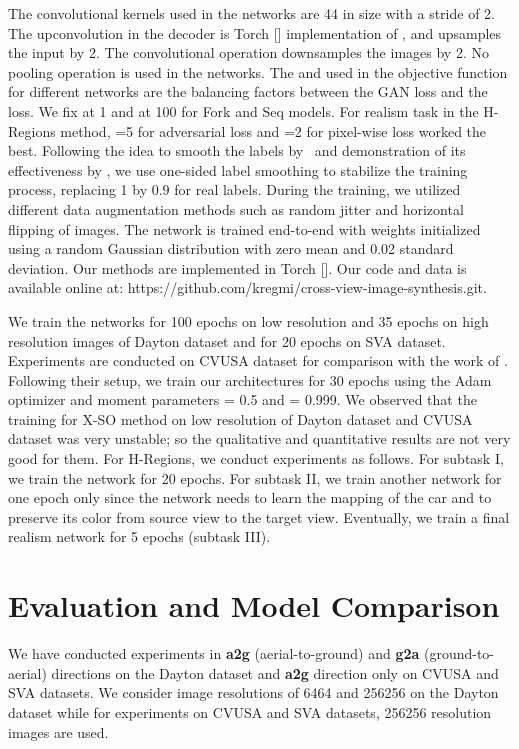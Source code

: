 \documentclass[times,twocolumn,final,authoryear]{elsarticle_modified}
\begin{document}
The convolutional kernels used in the networks are 44 in size with a stride of 2. The upconvolution in the decoder is Torch [\cite{torch}] implementation of , and upsamples the input by 2. The convolutional operation downsamples the images by 2. No pooling operation is used in the networks. The  and  used in the objective function for different networks are the balancing factors between the GAN loss and the  loss. We fix  at 1 and  at 100 for Fork and Seq models. For realism task in the H-Regions method, =5 for adversarial loss and =2 for pixel-wise loss worked the best. Following the idea to smooth the labels by~\cite{DBLP:conf/cvpr/SzegedyVISW16} and demonstration of its effectiveness by \cite{DBLP:conf/nips/SalimansGZCRCC16}, we use one-sided label smoothing to stabilize the training process, replacing 1 by 0.9 for real labels. During the training, we utilized different data augmentation methods such as random jitter and horizontal flipping of images. The network is trained end-to-end with weights initialized using a random Gaussian distribution with zero mean and 0.02 standard deviation. Our methods are implemented in Torch [\cite{torch}]. Our code and data is available online at: 
https://github.com/kregmi/cross-view-image-synthesis.git. 



We train the networks for 100 epochs on low resolution and 35 epochs on high resolution images of Dayton dataset and for 20 epochs on SVA dataset. Experiments are conducted on CVUSA dataset for comparison with the work of \cite{zhai2017crossview}. Following their setup, we train our architectures for 30 epochs using the Adam optimizer and moment parameters  = 0.5 and  = 0.999. We observed that the training for X-SO method on low resolution of Dayton dataset and CVUSA dataset was very unstable; so the qualitative and quantitative results are not very good for them. For H-Regions, we conduct experiments as follows. For subtask I, we train the network for 20 epochs. For subtask II, we train another network for one epoch only since the network needs to learn the mapping of the car and to preserve its color from source view to the target view. Eventually, we train a final realism network for 5 epochs (subtask III).

 \vspace{-5pt}
\section{Evaluation and Model Comparison}
\label{sec:results}
We have conducted experiments in \textbf{a2g} (aerial-to-ground) and \textbf{g2a} (ground-to-aerial) directions on the Dayton dataset and \textbf{a2g} direction only on CVUSA and SVA datasets. 
We consider image resolutions of 6464 and 256256 on the Dayton dataset while for experiments on CVUSA and SVA datasets, 256256 resolution images are used. 
\end{document}
